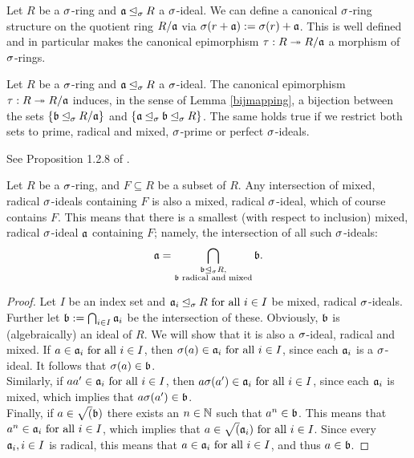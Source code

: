 \begin{rem}
Let $R$ be a $\sigma$-ring and $\mathfrak{a} \unlhd_{\sigma} R$ a $\sigma$-ideal. We can define a canonical $\sigma$-ring structure on the quotient ring $R/\mathfrak{a}$ via $\sigma(r+\mathfrak{a}):= \sigma(r) + \mathfrak{a}$. 
This is well defined and in particular makes the canonical epimorphism $\tau: R \twoheadrightarrow R/\mathfrak{a}$ a morphism of $\sigma$-rings.
\end{rem}

\begin{prop}\label{bijideals}
Let $R$ be a $\sigma$-ring and $\mathfrak{a} \unlhd_{\sigma} R$ a $\sigma$-ideal. The canonical epimorphism $\tau: R \twoheadrightarrow R/\mathfrak{a}$ induces, in the sense of Lemma \ref{bijmapping}, a bijection between the sets $\{ \mathfrak{b} \unlhd_{\sigma} R/\mathfrak{a} \}$ and $\{ \mathfrak{a} \unlhd_{\sigma} \mathfrak{b} \unlhd_{\sigma} R \}$. The same holds true if we restrict both sets to prime, radical and mixed, $\sigma$-prime or perfect $\sigma$-ideals.
\begin{bew}
See Proposition 1.2.8 of \cite{wibmer}.
\end{bew}
\end{prop}

\begin{rem}\label{wmwelldef}
Let $R$ be a $\sigma$-ring, and $F \subseteq R$ be a subset of $R$. Any intersection of mixed, radical $\sigma$-ideals containing $F$ is also a mixed, radical $\sigma$-ideal, which of course contains $F$. 
This means that there is a smallest (with respect to inclusion) mixed, radical $\sigma$-ideal $\mathfrak{a}$ containing $F$; namely, the intersection of all such $\sigma$-ideals:
\begin{align*} \mathfrak{a} = \bigcap_{\substack{ \mathfrak{b} \unlhd_{\sigma} R, \\ \mathfrak{b} \text{ radical and mixed}}} \mathfrak{b}. \end{align*}
\begin{proof}
Let $I$ be an index set and $\mathfrak{a}_i \unlhd_{\sigma} R \text{ for all } i \in I$ be mixed, radical $\sigma$-ideals. Further let $\mathfrak{b} := \bigcap_{i \in I} \mathfrak{a}_i$ be the intersection of these. Obviously, $\mathfrak{b}$ is (algebraically) an ideal of $R$. We will show that it is also a $\sigma$-ideal, radical and mixed.
If $a \in \mathfrak{a}_i \text{ for all } i \in I$, then $\sigma(a) \in \mathfrak{a}_i \text{ for all } i \in I$, since each $\mathfrak{a}_i$ is a $\sigma$-ideal.
It follows that $\sigma(a) \in \mathfrak{b}$. \\
\indent Similarly, if $aa' \in \mathfrak{a}_i \text{ for all } i \in I$, then $a \sigma(a') \in \mathfrak{a}_i \text{ for all } i \in I$, since each $\mathfrak{a}_i$ is mixed, which implies that $a \sigma(a') \in \mathfrak{b}$.  \\
\indent Finally, if $a \in \sqrt(\mathfrak{b})$ there exists an $n \in \mathbb{N}$ such that $a^n \in \mathfrak{b}$. This means that $a^n \in \mathfrak{a}_i \text{ for all } i \in I$, which implies that $a \in \sqrt(\mathfrak{a}_i) \text{ for all } i \in I$. Since every $\mathfrak{a}_i, i \in I$ is radical, this means that $a \in \mathfrak{a}_i \text{ for all } i \in I$,
and thus $a \in \mathfrak{b}$.
\end{proof}
\end{rem}

